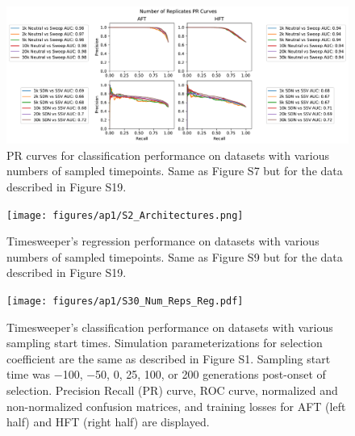 \begin{figure}
    \centering
    \includegraphics[width=\textwidth]{figures/ap1/S29_Num_Reps_PR.pdf}
    \caption[PR curves for classification performance on datasets with various numbers of sampled timepoints.]{PR curves for classification performance on datasets with various numbers of sampled timepoints. Same as Figure S7 but for the data described in Figure S19.}
    \label{fig:S29_Num_Reps_PR}
\end{figure}

\begin{figure}
    \centering
    \texttt{[image: figures/ap1/S2\_Architectures.png]}
    \caption[Timesweeper’s regression performance on datasets with various numbers of sampled timepoints.]{Timesweeper’s regression performance on datasets with various numbers of sampled timepoints. Same as Figure S9 but for the data described in Figure S19.}
    \label{fig:S2_Architectures}
\end{figure}

\begin{figure}
    \centering
    \texttt{[image: figures/ap1/S30\_Num\_Reps\_Reg.pdf]}
    \caption[Timesweeper’s classification performance on datasets with various sampling start times.]{Timesweeper’s classification performance on datasets with various sampling start times. Simulation parameterizations for selection coefficient are the same as described in Figure S1. Sampling start time was −100,  −50, 0, 25, 100, or 200 generations post-onset of selection. Precision Recall (PR) curve, ROC curve, normalized and non-normalized confusion matrices, and training losses for AFT (left half) and HFT (right half) are displayed.}
    \label{fig:S30_Num_Reps_Reg}
\end{figure}

